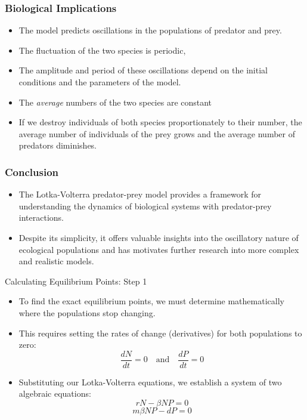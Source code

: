 \begin{frame}
    \frametitle{Biological Implications}
    \begin{itemize}
        \item The model predicts oscillations in the populations of predator and prey.
        \item The fluctuation of the two species is periodic,
    \item The amplitude and period of these oscillations depend on the initial conditions and the parameters of the model.
    \item  The \textit{average} numbers of the two species are constant
    \item  If we  destroy individuals of both species  proportionately to their number, the average number of individuals of the prey grows and the average number of predators diminishes.
    \end{itemize}
\end{frame}



\begin{frame}
    \frametitle{Conclusion}
    \begin{itemize}
        \item The Lotka-Volterra predator-prey model provides a  framework for understanding the dynamics of biological systems with predator-prey interactions.
        \item Despite its simplicity, it offers valuable insights into the oscillatory nature of ecological populations and has motivates further research into more complex and realistic models.
    \end{itemize}
\end{frame}

\begin{frame}{Calculating Equilibrium Points: Step 1}
    \begin{itemize}
        \item To find the exact equilibrium points, we must determine mathematically where the populations stop changing.
        \pause
        \item This requires setting the rates of change (derivatives) for both populations to zero:
        \begin{equation}
            \frac{dN}{dt} = 0 \quad \text{and} \quad \frac{dP}{dt} = 0
        \end{equation}
        \pause
        \item Substituting our Lotka-Volterra equations, we establish a system of two algebraic equations:
        \begin{equation}
            rN - \beta NP = 0
        \end{equation}
        \begin{equation}
            m\beta NP - dP = 0
        \end{equation}
    \end{itemize}
\end{frame}

